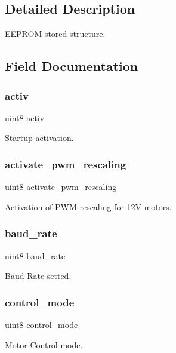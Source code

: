 \subsection{Detailed Description}
E\+E\+P\+R\+OM stored structure. 



\subsection{Field Documentation}
\mbox{\label{structst__mem_a63bbebc1db55f43e0571006597a3488b}} 
\subsubsection{activ}
{\footnotesize\ttfamily uint8 activ}

Startup activation. \mbox{\label{structst__mem_a53d9d645351f4020826ab8c56c91b244}} 
\subsubsection{activate\+\_\+pwm\+\_\+rescaling}
{\footnotesize\ttfamily uint8 activate\+\_\+pwm\+\_\+rescaling}

Activation of P\+WM rescaling for 12V motors. \mbox{\label{structst__mem_a1a2b3002580421effeca67955a862580}} 
\subsubsection{baud\+\_\+rate}
{\footnotesize\ttfamily uint8 baud\+\_\+rate}

Baud Rate setted. \mbox{\label{structst__mem_af0c55b7d870673f2f6e9521c215d4b51}} 
\subsubsection{control\+\_\+mode}
{\footnotesize\ttfamily uint8 control\+\_\+mode}

Motor Control mode. \mbox{\label{structst__mem_a29cec4cab946141aae2509b04e2f5097}} 

